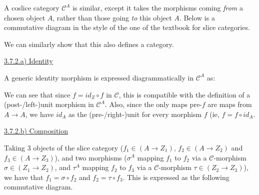 \documentclass[12pt, letterpaper, twoside]{report}
\begin{document}
A coslice category $\mathcal{C}^A$ is similar, except it takes the morphisms coming \textit{from} a chosen object $A$, rather than those going \textit{to} this object $A$. Below is a commutative diagram in the style of the one of the textbook for slice categories.


We can similarly show that this also defines a category.

\vspace{5mm}
\underline{3.7.2.a) Identity}

A generic identity morphism is expressed diagrammatically in $\mathcal{C}^A$ as:


We can see that since $f = id_Z \circ f$ in $\mathcal{C}$, this is compatible with the definition of a (post-/left-)unit morphism in $\mathcal{C}^A$. Also, since the only maps pre-$f$ are maps from $A \to A$, we have $id_A$ as the (pre-/right-)unit for every morphism $f$ (ie, $f = f \circ id_A$. 

\vspace{5mm}
\underline{3.7.2.b) Composition}

Taking 3 objects of the slice category ($f_1 \in (A \to Z_1)$, $f_2 \in (A \to Z_2)$ and $f_3 \in (A \to Z_3)$), and two morphisms ($\sigma^A$ mapping $f_1$ to $f_2$ via a $\mathcal{C}$-morphism $\sigma \in (Z_1 \to Z_2)$, and $\tau^A$ mapping $f_2$ to $f_3$ via a $\mathcal{C}$-morphism $\tau \in (Z_2 \to Z_3)$), we have that $f_1 = \sigma \circ f_2$ and $f_2 = \tau  \circ f_3$. This is expressed as the following commutative diagram.
\end{document}
